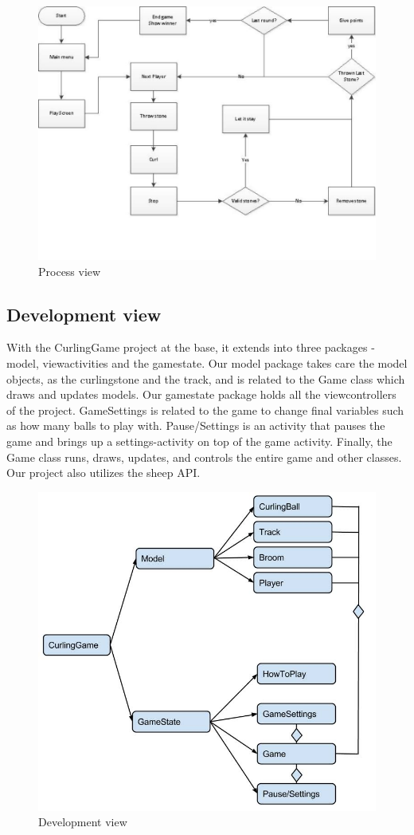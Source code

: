 \begin{figure}[ht!]
	\centering
	\includegraphics[width=150mm]{view.jpg}
	\caption{Process view}
	\label{fig:viewpoint}
\end{figure}

\newpage
\subsection{Development view}
With the CurlingGame project at the base, it extends into three packages - model, viewactivities and the gamestate. Our model package takes care the model objects, as the curlingstone and the track, and is related to the Game class which draws and updates models. Our gamestate package holds all the viewcontrollers of the project. GameSettings is related to the game to change final variables such as how many balls to play with. Pause/Settings is an activity that pauses the game and brings up a settings-activity on top of the game activity. Finally, the Game class runs, draws, updates, and controls the entire game and other classes. Our project also utilizes the sheep API.

\begin{figure}[ht!]
	\centering
	\includegraphics[width=150mm]{development_view.jpg}
	\caption{Development view}
	\label{fig:viewpoint}
\end{figure}